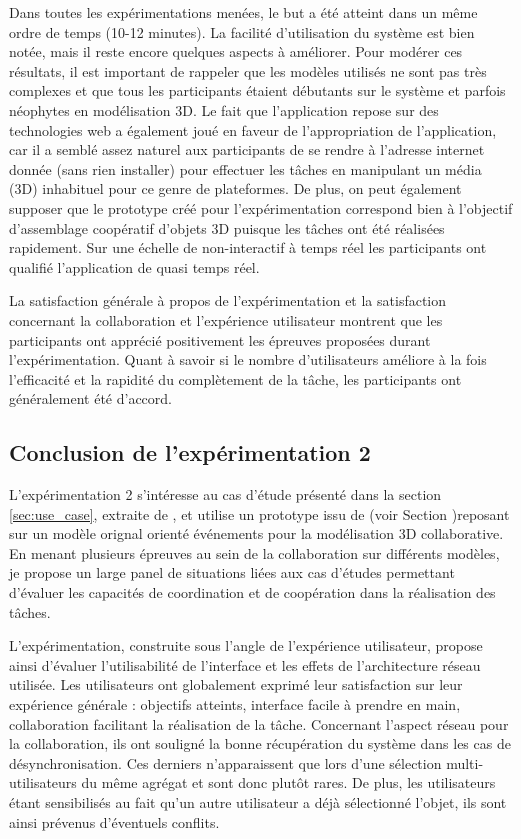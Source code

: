 Dans toutes les expérimentations menées, le but a été atteint dans 
un même ordre de temps (10-12 minutes). La facilité d'utilisation du système est bien notée, 
mais il reste encore quelques aspects à améliorer. Pour modérer ces résultats, il 
est important de rappeler que les modèles utilisés ne sont pas très complexes et que tous les participants étaient débutants sur le système et parfois néophytes en modélisation 3D.
Le fait que l'application repose sur des technologies web a également joué en faveur de 
l'appropriation de l'application, car il a semblé assez naturel aux participants de se 
rendre à l'adresse internet donnée (sans rien installer) pour effectuer les tâches en 
manipulant un média (3D) inhabituel pour ce genre de plateformes. De plus, on 
peut également supposer que le prototype créé pour l'expérimentation correspond 
bien à l'objectif d'assemblage coopératif d'objets \gls{3D} puisque les tâches ont 
 été réalisées rapidement. Sur une échelle de \og non-interactif \fg{} à \og 
temps réel\fg{} les participants ont qualifié l'application de \og quasi 
temps réel\fg{}. 

La satisfaction générale à propos de l'expérimentation et la satisfaction concernant 
la collaboration et l'expérience utilisateur montrent que les participants 
ont apprécié positivement les épreuves proposées durant l'expérimentation. Quant à savoir si le nombre d'utilisateurs améliore à la fois 
l'efficacité et la rapidité du complètement de la tâche, les participants ont 
généralement été d'accord.

\subsection{Conclusion de l'expérimentation 2}

L'expérimentation 2 s'intéresse au cas d'étude présenté dans la section 
\ref{sec:use_case}, extraite de \cite{Desprat2017}, et utilise un prototype issu de 
\cite{Desprat2016} (voir Section )reposant sur un modèle orignal 
orienté événements pour la modélisation \gls{3D} collaborative. En menant 
plusieurs 
épreuves au sein de la collaboration sur différents modèles, je propose un large panel 
de situations liées aux cas d'études permettant d'évaluer les capacités de coordination et 
de coopération dans la réalisation des tâches.

L'expérimentation, construite sous l'angle de l'expérience utilisateur, propose ainsi 
d'évaluer l'utilisabilité de l'interface et les effets de l'architecture réseau utilisée. 
Les utilisateurs ont globalement exprimé leur satisfaction sur leur expérience 
générale : objectifs atteints, interface facile à prendre en main, collaboration 
facilitant la réalisation de la tâche. Concernant l'aspect réseau pour la collaboration, 
ils ont souligné la bonne récupération du système dans les cas de 
désynchronisation. Ces derniers n'apparaissent que lors d'une sélection 
multi-utilisateurs du même agrégat et sont donc plutôt rares. De plus, les utilisateurs étant 
sensibilisés au fait qu'un autre utilisateur a déjà sélectionné l'objet, ils sont ainsi prévenus d'éventuels conflits. 

